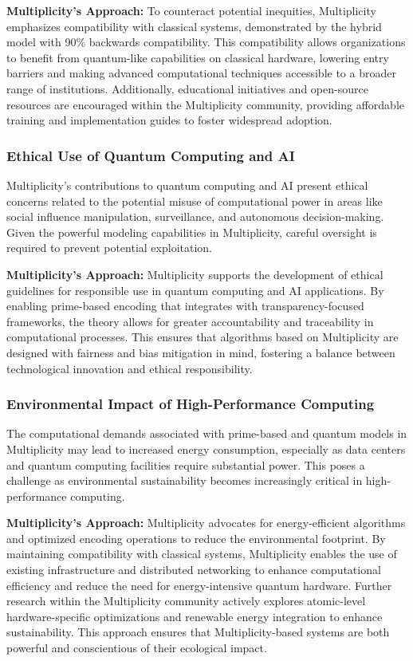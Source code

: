 \documentclass{article}
\theoremstyle{plain}
\begin{document}
\begin{enumerate}
\textbf{Multiplicity’s Approach:} To counteract potential inequities, Multiplicity emphasizes compatibility with classical systems, demonstrated by the hybrid model with 90\% backwards compatibility. This compatibility allows organizations to benefit from quantum-like capabilities on classical hardware, lowering entry barriers and making advanced computational techniques accessible to a broader range of institutions. Additionally, educational initiatives and open-source resources are encouraged within the Multiplicity community, providing affordable training and implementation guides to foster widespread adoption.

\subsubsection{Ethical Use of Quantum Computing and AI}
Multiplicity’s contributions to quantum computing and AI present ethical concerns related to the potential misuse of computational power in areas like social influence manipulation, surveillance, and autonomous decision-making. Given the powerful modeling capabilities in Multiplicity, careful oversight is required to prevent potential exploitation.

\textbf{Multiplicity’s Approach:} Multiplicity supports the development of ethical guidelines for responsible use in quantum computing and AI applications. By enabling prime-based encoding that integrates with transparency-focused frameworks, the theory allows for greater accountability and traceability in computational processes. This ensures that algorithms based on Multiplicity are designed with fairness and bias mitigation in mind, fostering a balance between technological innovation and ethical responsibility.

\subsubsection{Environmental Impact of High-Performance Computing}
The computational demands associated with prime-based and quantum models in Multiplicity may lead to increased energy consumption, especially as data centers and quantum computing facilities require substantial power. This poses a challenge as environmental sustainability becomes increasingly critical in high-performance computing.

\textbf{Multiplicity’s Approach:} Multiplicity advocates for energy-efficient algorithms and optimized encoding operations to reduce the environmental footprint. By maintaining compatibility with classical systems, Multiplicity enables the use of existing infrastructure and distributed networking to enhance computational efficiency and reduce the need for energy-intensive quantum hardware. Further research within the Multiplicity community actively explores atomic-level hardware-specific optimizations and renewable energy integration to enhance sustainability. This approach ensures that Multiplicity-based systems are both powerful and conscientious of their ecological impact.


\end{enumerate}
\end{document}
